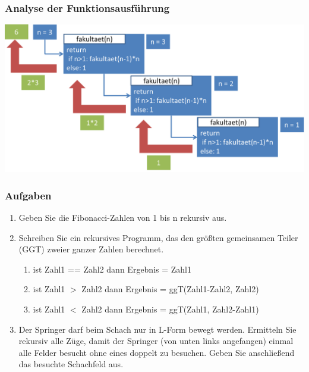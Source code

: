 \begin{frame}[fragile]
	  \frametitle{Analyse der Funktionsausführung}
	  \begin{center}
	  \includegraphics[width=1\textwidth,
	  keepaspectratio=true]{bilder/rekursion_konkret.png}
	  \end{center}
\end{frame}

\begin{frame}
	\frametitle{Aufgaben}
	\begin{enumerate}
	  \item Geben Sie die Fibonacci-Zahlen von 1 bis n rekursiv aus.
	  \item Schreiben Sie ein rekursives Programm, das den größten gemeinsamen
	  Teiler (GGT) zweier ganzer Zahlen berechnet.
	  \begin{enumerate}
	    \item ist Zahl1 == Zahl2 dann Ergebnis = Zahl1
		\item ist Zahl1  $>$ Zahl2 dann Ergebnis = ggT(Zahl1-Zahl2, Zahl2)
		\item ist Zahl1  $<$ Zahl2 dann Ergebnis = ggT(Zahl1, Zahl2-Zahl1)
	  \end{enumerate}
	  \item Der Springer darf beim Schach nur in L-Form bewegt werden. Ermitteln
	  		Sie rekursiv alle Züge, damit der Springer (von unten links angefangen)
	  		einmal alle Felder besucht ohne eines doppelt zu besuchen. Geben Sie
	  		anschließend das besuchte Schachfeld aus.
	\end{enumerate}
\end{frame}

